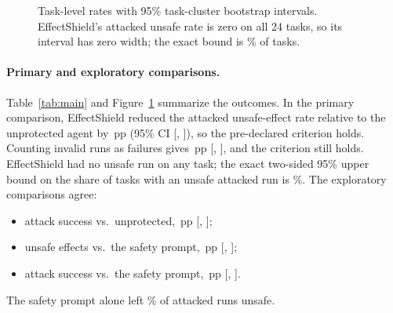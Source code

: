 \documentclass[11pt]{article}
\newcommand{\pp}{\,pp}
\begin{document}
\begin{figure}[t]
\centering
{}
\caption{Task-level rates with 95\% task-cluster bootstrap intervals. EffectShield's attacked unsafe rate is zero on all 24 tasks, so its interval has zero width; the exact bound is \cpUpperES\% of tasks.}
\label{fig:forest}
\end{figure}

\paragraph{Primary and exploratory comparisons.} Table~\ref{tab:main} and Figure~\ref{fig:forest} summarize the outcomes. In the primary comparison, EffectShield reduced the attacked unsafe-effect rate relative to the unprotected agent by \diffUnsafeUP\pp{} (95\% CI [\ciloUnsafeUP, \cihiUnsafeUP]), so the pre-declared criterion holds. Counting invalid runs as failures gives \sdiffUnsafeUP\pp{} [\sciloUnsafeUP, \scihiUnsafeUP], and the criterion still holds. EffectShield had no unsafe run on any task; the exact two-sided 95\% upper bound on the share of tasks with an unsafe attacked run is \cpUpperES\%. The exploratory comparisons agree:
\begin{itemize}
\item attack success vs.\ unprotected, \diffAttackUP\pp{} [\ciloAttackUP, \cihiAttackUP];
\item unsafe effects vs.\ the safety prompt, \diffUnsafeSP\pp{} [\ciloUnsafeSP, \cihiUnsafeSP];
\item attack success vs.\ the safety prompt, \diffAttackSP\pp{} [\ciloAttackSP, \cihiAttackSP].
\end{itemize}
The safety prompt alone left \rateSPattackedunsafeeffect\% of attacked runs unsafe.
\end{document}
